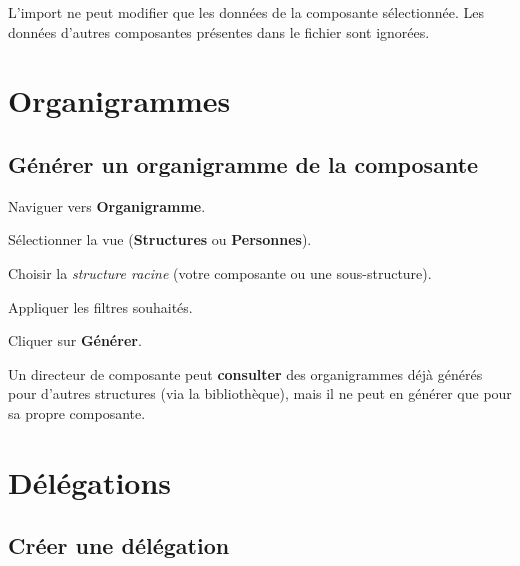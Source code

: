 \begin{warnbox}
  L'import ne peut modifier que les donn\'ees de la composante s\'electionn\'ee. Les donn\'ees d'autres composantes pr\'esentes dans le fichier sont ignor\'ees.
\end{warnbox}

\section{Organigrammes}

\subsection{G\'en\'erer un organigramme de la composante}

\begin{steps}
  \item Naviguer vers \textbf{Organigramme}.
  \item S\'electionner la vue (\textbf{Structures} ou \textbf{Personnes}).
  \item Choisir la \textit{structure racine} (votre composante ou une sous-structure).
  \item Appliquer les filtres souhait\'es.
  \item Cliquer sur \textbf{G\'en\'erer}.
\end{steps}


\begin{notebox}
  Un directeur de composante peut \textbf{consulter} des organigrammes d\'ej\`a g\'en\'er\'es pour d'autres structures (via la biblioth\`eque), mais il ne peut en g\'en\'erer que pour sa propre composante.
\end{notebox}

\section{D\'el\'egations}

\subsection{Cr\'eer une d\'el\'egation}

